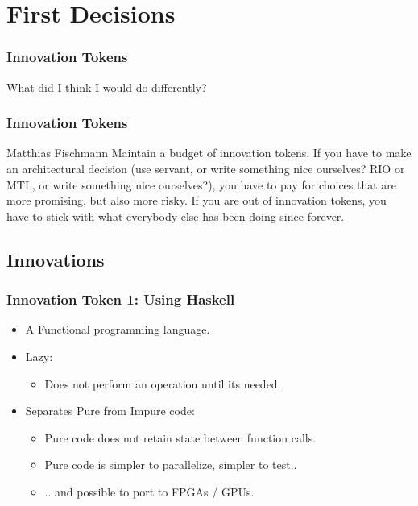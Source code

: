 \documentclass[hyperref={pdfpagemode=FullScreen},aspectratio=169]{beamer}
\begin{document}
\section{First Decisions}

\begin{frame}
  \frametitle{Innovation Tokens}
  \Huge{\centerline{What did I think I would do differently?}}
\end{frame}

\begin{frame}
  \frametitle{Innovation Tokens}
  \begin{block}{Matthias Fischmann}
    Maintain a budget of innovation tokens. If you have to make an architectural decision (use servant, or write something nice ourselves? RIO or MTL, or write something nice ourselves?), you have to pay for choices that are more promising, but also more risky. If you are out of innovation tokens, you have to stick with what everybody else has been doing since forever.
  \end{block}

\end{frame}

\subsection{Innovations}

\begin{frame}
  \frametitle{Innovation Token 1: Using Haskell}
  \begin{itemize}
  \item A Functional programming language.
  \item Lazy:
    \begin{itemize}
    \item Does not perform an operation until its needed.
    \end{itemize}
  \item Separates Pure from Impure code:
    \begin{itemize}
    \item Pure code does not retain state between function calls.
    \item Pure code is simpler to parallelize, simpler to test.. 
    \item .. and possible to port to FPGAs / GPUs.
    \end{itemize}
  \end{itemize}
\end{frame}
\end{document}
